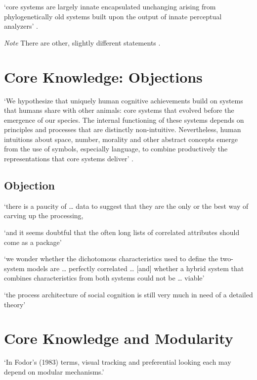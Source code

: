 \documentclass[12pt]{extarticle}
\begin{document}
\begin{multicols}{3}
‘core systems are 
largely innate 
encapsulated 
unchanging 
arising from phylogenetically old systems 
built upon the output of innate perceptual analyzers’ 
\citep[p.\ 520]{Carey:1996hl}.
 
\textit{Note} There are other, slightly different statements \citep[e.g.][]{carey:2009_origin}.
 
 
 
\section{Core Knowledge: Objections}
 
‘We hypothesize that uniquely human cognitive achievements build on systems that humans 
share with other animals: core systems that evolved before the emergence of our species. 
The internal functioning of these systems depends on principles and processes that are 
distinctly non-intuitive.  Nevertheless, human intuitions about space, number, morality 
and other abstract concepts emerge from the use of symbols, especially language, to 
combine productively the representations that core systems deliver’
\citep[pp.\ 2784-5]{spelke:2012_core}.
\citep[p.\ 517]{Carey:1996hl}
 
\subsection{Objection}
 
‘there is a paucity of … data to suggest that they are the only or the best way of carving up the processing,
 
‘and it seems doubtful that the often long lists of correlated attributes should come as a package’
\citep[p.\ 759]{adolphs_conceptual_2010}
 
‘we wonder whether the dichotomous characteristics used to define the two-system models are … perfectly correlated …
[and] whether a hybrid system that combines characteristics from both systems could not be … viable’
\citep[p.\ 537]{keren_two_2009}
 
‘the process architecture of social cognition is still very much in need of a detailed theory’
\citep[p.\ 759]{adolphs_conceptual_2010}
 
 
 
\section{Core Knowledge and Modularity}
 
‘In Fodor’s (1983) terms, visual tracking and preferential looking each may depend on modular mechanisms.’
\citep[p.\ 137]{spelke:1995_spatiotemporal}
 

\end{multicols}
\end{document}
